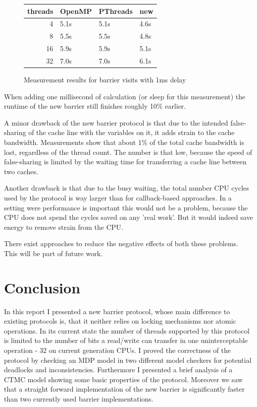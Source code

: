 \documentclass[a4paper, 10pt]{article}
\begin{document}
\begin{figure}[htbp]
	\centering
	\begin{tabular}{r | l l l}
		threads & OpenMP & PThreads & new \\
		\hline
		 4      & 5.1s   & 5.1s     & 4.6s \\
		 8      & 5.5s   & 5.5s     & 4.8s \\
		16      & 5.9s   & 5.9s     & 5.1s \\
		32      & 7.0s   & 7.0s     & 6.1s \\
	\end{tabular}
	\caption{Measurement results for barrier visits with 1ms delay}
	\label{fig:measurement-2}
\end{figure}

When adding one millisecond of calculation (or sleep for this measurement) the runtime of the new barrier still finishes roughly 10\% earlier.

A minor drawback of the new barrier protocol is that due to the intended false-sharing of the cache line with the variables on it, it adds strain to the cache bandwidth. Measurements show that about 1\% of the total cache bandwidth is lost, regardless of the thread count. The number is that low, because the speed of false-sharing is limited by the waiting time for transferring a cache line between two caches.

Another drawback is that due to the busy waiting, the total number CPU cycles used by the protocol is way larger than for callback-based approaches. In a setting were performance is important this would not be a problem, because the CPU does not spend the cycles saved on any 'real work'. But it would indeed save energy to remove strain from the CPU.

There exist approaches to reduce the negative effects of both these problems. This will be part of future work.

\section{Conclusion}
In this report I presented a new barrier protocol, whose main difference to existing protocols is, that it neither relies on locking mechanisms nor atomic operations.
In its current state the number of threads supported by this protocol is limited to the number of bits a read/write can transfer in one uninterceptable operation - 32 on current generation CPUs.
I proved the correctness of the protocol by checking an MDP model in two different model checkers for potential deadlocks and inconsistencies.
Furthermore I presented a brief analysis of a CTMC model showing some basic properties of the protocol.
Moreover we saw that a straight forward implementation of the new barrier is significantly faster than two currently used barrier implementations.
\end{document}
